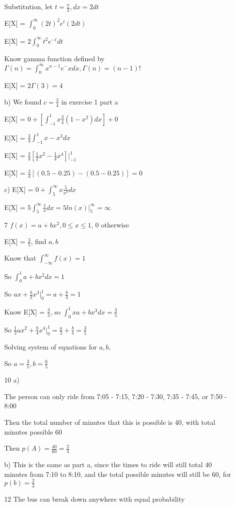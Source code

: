 \documentclass[12pt]{article}
\begin{document}
\begin{itemize}
  Substitution, let $t = \frac{x}{2}, dx = 2dt$

  E[X] = $\int_{0}^{\infty} (2t)^2 e^{t} (2dt)$

  E[X] = $2 \int_{0}^{\infty} t^2 e^{-t} dt$

  Know gamma function defined by $\Gamma (n) = \int_{0}^{\infty} x^{n-1} e^-x dx, \Gamma (n) = (n-1)!$

  E[X] = $2\Gamma (3) = 4$ 

  b) We found $c = \frac{3}{4}$ in exercise 1 part a

  E[X] = $0 + [\int_{-1}^{1} x \frac{3}{4} (1 - x^2)dx] + 0$

  E[X] = $\frac{3}{4}\int_{-1}^{1} x - x^3 dx$

  E[X] = $\frac{3}{4}[\frac{1}{2} x^2 - \frac{1}{4} x^4]\big|_{-1}^{1}$

  E[X] = $\frac{3}{4}[(0.5 - 0.25) - (0.5 - 0.25)] = 0$

  c) E[X] = $0 + \int_{5}^{\infty} x \frac{5}{x^2} dx$

  E[X] = $5\int_{5}^{\infty} \frac{1}{x} dx = 5ln(x)\big|_{5}^{\infty} = \infty$
\item[7]
  $f(x) = a + bx^2, 0 \leq x \leq 1$, 0 otherwise

  E[X] = $\frac{3}{5}$, find $a, b$

  Know that $\int_{-\infty}^{\infty} f(x) = 1$

  So $\int_{0}^{1} a + bx^2 dx = 1$

  So $ax + \frac{b}{3} x^3 \big|_0^1 = a + \frac{b}{3} = 1$

  Know E[X] = $\frac{3}{5}$, so $\int_{0}^{1} xa + bx^3 dx = \frac{3}{5}$

  So $\frac{1}{2} ax^2 + \frac{b}{4} x^4 \big|_0^1 = \frac{a}{2} + \frac{b}{4} = \frac{3}{5}$

  Solving system of equations for $a,b$,

  So $a = \frac{3}{5}, b = \frac{6}{5}$
\item[10]
  a) 

  The person can only ride from 7:05 - 7:15, 7:20 - 7:30, 7:35 - 7:45, or 7:50 - 8:00

  Then the total number of minutes that this is possible is 40, with total minutes possible 60

  Then $p(A) = \frac{40}{60} = \frac{2}{3}$

  b) This is the same as part a, since the times to ride will still total 40 minutes from 7:10 to 8:10, and the total possible minutes will still be 60, for $p(b) = \frac{2}{3}$
\item[12]
  The bus can break down anywhere with equal probability


\end{itemize}
\end{document}
